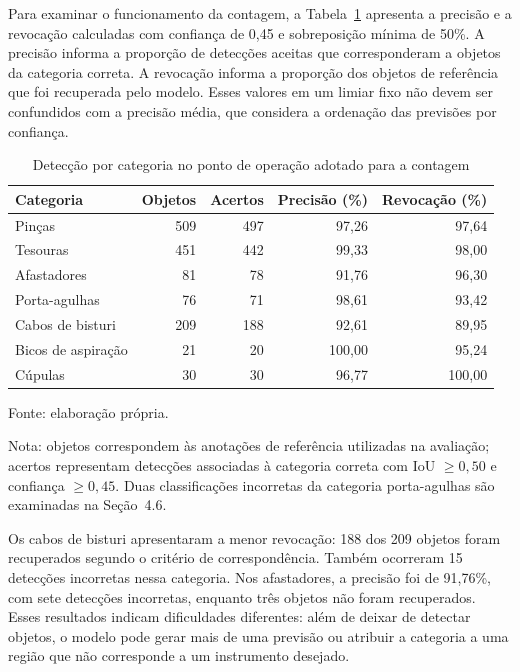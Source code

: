 Para examinar o funcionamento da contagem, a Tabela~\ref{tab:res-deteccao} apresenta a precisão e a revocação calculadas com confiança de 0,45 e sobreposição mínima de 50\%. A precisão informa a proporção de detecções aceitas que corresponderam a objetos da categoria correta. A revocação informa a proporção dos objetos de referência que foi recuperada pelo modelo. Esses valores em um limiar fixo não devem ser confundidos com a precisão média, que considera a ordenação das previsões por confiança.

\begin{table}[htbp]
\centering
\caption{Detecção por categoria no ponto de operação adotado para a contagem}
\label{tab:res-deteccao}
\begin{minipage}{\linewidth}\small\singlespacing
\centering
\begin{tabular}{p{4.1cm}rrrr}
\hline
Categoria & Objetos & Acertos & Precisão (\%) & Revocação (\%) \\
\hline
Pinças & 509 & 497 & 97,26 & 97,64 \\
Tesouras & 451 & 442 & 99,33 & 98,00 \\
Afastadores & 81 & 78 & 91,76 & 96,30 \\
Porta-agulhas & 76 & 71 & 98,61 & 93,42 \\
Cabos de bisturi & 209 & 188 & 92,61 & 89,95 \\
Bicos de aspiração & 21 & 20 & 100,00 & 95,24 \\
Cúpulas & 30 & 30 & 96,77 & 100,00 \\
\hline
\end{tabular}
\par\smallskip\raggedright\footnotesize Fonte: elaboração própria.

Nota: objetos correspondem às anotações de referência utilizadas na avaliação; acertos representam detecções associadas à categoria correta com IoU $\geq 0{,}50$ e confiança $\geq 0{,}45$. Duas classificações incorretas da categoria porta-agulhas são examinadas na Seção~4.6.

\end{minipage}
\end{table}

Os cabos de bisturi apresentaram a menor revocação: 188 dos 209 objetos foram recuperados segundo o critério de correspondência. Também ocorreram 15 detecções incorretas nessa categoria. Nos afastadores, a precisão foi de 91,76\%, com sete detecções incorretas, enquanto três objetos não foram recuperados. Esses resultados indicam dificuldades diferentes: além de deixar de detectar objetos, o modelo pode gerar mais de uma previsão ou atribuir a categoria a uma região que não corresponde a um instrumento desejado.


